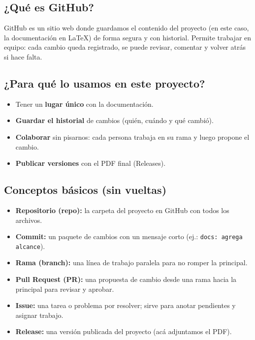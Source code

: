 \subsection*{¿Qué es GitHub?}
GitHub es un sitio web donde guardamos el contenido del proyecto (en este caso, la documentación en \LaTeX) de forma segura y con historial. 
Permite trabajar en equipo: cada cambio queda registrado, se puede revisar, comentar y volver atrás si hace falta.

\subsection*{¿Para qué lo usamos en este proyecto?}
\begin{itemize}[leftmargin=1.2em]
  \item Tener un \textbf{lugar único} con la documentación.
  \item \textbf{Guardar el historial} de cambios (quién, cuándo y qué cambió).
  \item \textbf{Colaborar} sin pisarnos: cada persona trabaja en su rama y luego propone el cambio.
  \item \textbf{Publicar versiones} con el PDF final (Releases).
\end{itemize}

\subsection*{Conceptos básicos (sin vueltas)}
\begin{itemize}[leftmargin=1.2em]
  \item \textbf{Repositorio (repo):} la carpeta del proyecto en GitHub con todos los archivos.
  \item \textbf{Commit:} un paquete de cambios con un mensaje corto (ej.: \texttt{docs: agrega alcance}).
  \item \textbf{Rama (branch):} una línea de trabajo paralela para no romper la principal.
  \item \textbf{Pull Request (PR):} una propuesta de cambio desde una rama hacia la principal para revisar y aprobar.
  \item \textbf{Issue:} una tarea o problema por resolver; sirve para anotar pendientes y asignar trabajo.
  \item \textbf{Release:} una versión publicada del proyecto (acá adjuntamos el PDF).
\end{itemize}

